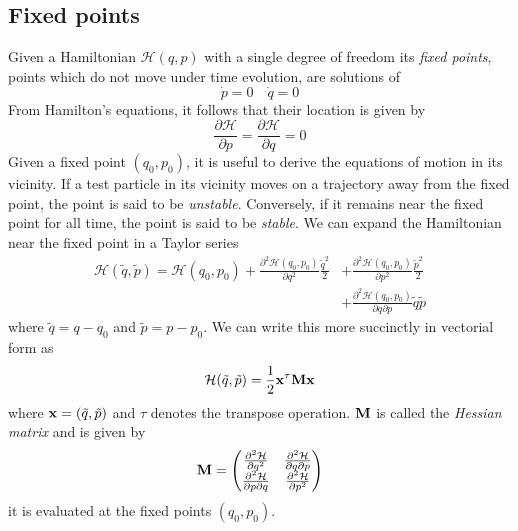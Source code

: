 \documentclass[twoside,openright,titlepage,numbers=noenddot,headinclude,%
                footinclude=true,cleardoublepage=empty,abstractoff, 
                BCOR=5mm,paper=a4,fontsize=11pt,%
                american,%
                ]{scrreprt}%
\begin{document}
\subsection{Fixed points}
Given a Hamiltonian $\mathcal{H}(q,p)$ with a single degree of freedom
its \emph{fixed points}, points which do not move under time evolution,
are solutions of
\begin{equation}
    \dot{p}=0\quad\dot{q}=0
\end{equation}
From 
Hamilton's equations, it follows that their location is given by
\begin{equation}
   \frac{\partial \mathcal{H}}{\partial p}= \frac{\partial \mathcal{H}}{\partial q}=0
\end{equation}
Given a fixed point $(q_0,p_0)$, it is useful to derive the equations
of motion in its vicinity. If a test particle in its vicinity moves 
on a trajectory away from the fixed point, the point is said to be
\emph{unstable}. Conversely, if it remains near the fixed point for all 
time, the point is said to be \emph{stable}. We can expand the Hamiltonian
near the fixed point in a Taylor series
\begin{align}
    \mathcal{H}(\tilde q, \tilde p)=\mathcal{H}(q_0,p_0) 
    + \frac{\partial^2\mathcal{H}(q_0,p_0)}{\partial q^2} \frac{\tilde q^2}{2} 
    &+\frac{\partial^2\mathcal{H}(q_0,p_0)}{\partial p^2} \frac{\tilde p^2}{2} \nonumber\\
    &+\frac{\partial^2\mathcal{H}(q_0,p_0)}{\partial q\partial p}\tilde q\tilde p 
\end{align}
where $\tilde q=q-q_0$ and $\tilde p=p-p_0$. We can write this more succinctly 
in vectorial form as
\begin{equation}
    \mathcal{H}(\tilde q,\tilde p)= \frac{1}{2} \boldsymbol{\mathbf{x}}^\tau\boldsymbol{\mathbf{M}}\boldsymbol{\mathbf{x}}
\end{equation}
where $\boldsymbol{\mathbf{x}}=(\tilde q, \tilde p)$ and $\tau$ denotes the transpose 
operation. $\boldsymbol{\mathbf{M}}$ is called the \emph{Hessian matrix} and is given by
\begin{equation}
    \boldsymbol{\mathbf{M}}=
    \begin{pmatrix}
        \frac{\partial^2 \mathcal{H}}{\partial q^2} &
        \frac{\partial^2 \mathcal{H}}{\partial q\partial p }\\
        \frac{\partial^2 \mathcal{H}}{\partial p \partial q} &
        \frac{\partial^2 \mathcal{H}}{\partial p^2} 
    \end{pmatrix}
    \label{eq:fixed_points_stability}
\end{equation}
it is evaluated at the fixed points $(q_0,p_0)$.
\end{document}
